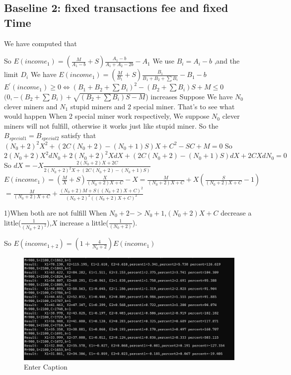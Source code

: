 \documentclass{article}
\begin{document}
\subsection{Baseline 2: fixed transactions fee and fixed Time}
We have computed that \par So $E(income_1)=(\frac{M}{A_1-b}+S)\frac{A_1-b}{A_1+A_2-2b}-A_1$
We use $B_i=A_i-b$ ,and the limit $D_i$
We have $E(income_1)=(\frac{M}{B_1}+S)\frac{B_1}{B_1+B_2+\sum B_i}-B_1-b$
$E^{'}(income_1)\ge 0
\Longleftrightarrow(B_1+B_2+\sum B_i)^2-(B_2+\sum B_i)S+M\le 0$
$(0,-(B_2+\sum B_i)+\sqrt{(B_2+\sum B_i)S-M}$) increases
Suppose We have $N_0$ clever miners and $N_1$ stupid miners and 2 special miner.
That's to see what would happen
When 2 special miner work respectively, We suppose $N_0$ clever miners will not fulfill, otherwise it works just like stupid miner.
So the $B_{special1}=B_{special2}$ satisfy that $(N_0+2)^2X^2+(2C(N_0+2)-(N_0+1)S)X+C^2-SC+M=0$
So $2(N_0+2)X^2dN_0+2(N_0+2)^2XdX+(2C(N_0+2)-(N_0+1)S)dX+2CXdN_0=0$
So $dX=-X\frac{2(N_0+2)X+2C}{2(N_0+2)^2X+(2C(N_0+2)-(N_0+1)S)}$
$E(income_1)=(\frac{M}{X}+S)\frac{X}{(N_0+2)X+C}-X=\frac{M}{(N_0+2)X+C}+X(\frac{S}{(N_0+2)X+C}-1)$
$=\frac{M}{(N_0+2)X+C}+\frac{(N_0+2)M+S((N_0+2)X+C)^2}{(N_0+2)^2((N_0+2)X+C)^2}$
\par1)When both are not fulfill
When $N_0+2->N_0+1$,$(N_0+2)X+C$ decrease a little($\frac{1}{(N_0+2)^2}$),$X$ increase a little($\frac{1}{(N_0+2)}$).
\par So $E(income_{1+2})=(1+\frac{4}{N_0+2})E(income_1)$
\begin{figure}
    \centering
    \includegraphics[width=1\linewidth]{3.png}
    \caption{Enter Caption}
    \label{fig:enter-label}
\end{figure}
\end{document}
